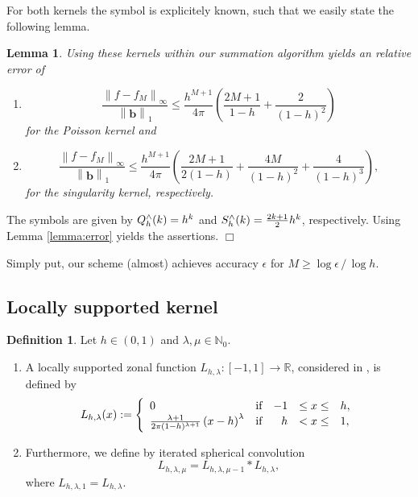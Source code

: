 \documentclass[11pt,a4paper,twoside,bibtotoc]{scrartcl}
\theoremstyle{plain}
\newtheorem{lemma}[theorem]{Lemma}
\theoremstyle{definition}
\newtheorem{definition}[theorem]{Definition}
\theoremstyle{remark}
\newenvironment{proof}{{\bf Proof.}}{$\Box$}
\newcommand{\NZ}{\ensuremath{\mathbb{N}_{0}}}
\newcommand{\R}{\ensuremath{\mathbb{R}}}
\newcommand{\interv}[4]{\ensuremath{\left#1\left.#2,#3\right#4\right.}}
\newcommand{\fun}[2]{\ensuremath{#1{\hspace{-0.4ex}}\left(#2\right)}}
\newcommand{\paren}[1]{\ensuremath{\left(#1\right)}}
\newcommand{\mb}[1]{\mathbf{#1}}
\newcommand{\V}[1]{\mb{#1}}
\numberwithin{equation}{section}
\numberwithin{table}{section}
\numberwithin{figure}{section}
\begin{document}
For both kernels the symbol is explicitely known, such that we easily state
the following lemma.
\begin{lemma}
 Using these kernels within our summation algorithm yields an relative error
 of
 \begin{enumerate}
   \item
     \begin{equation}
       \label{error:poisson}
       \frac{\left\|f - f_{M}\right\|_{\infty}}{\left\|\V{b}\right\|_1} \le
       \frac{h^{M+1}}{4\pi} \left(\frac{2M+1}{1-h}+\frac{2}{\left(1-h\right)^2}\right)
     \end{equation}
     for the Poisson kernel and
     \item 
       \begin{equation}
         \label{error:singular}
         \frac{\left\|f - f_{M}\right\|_{\infty}}{\left\|\V{b}\right\|_1} \le
         \frac{h^{M+1}}{4\pi} \left(\frac{2M+1}{2\left(1-h\right)}+
           \frac{4M}{\left(1-h\right)^2}+ \frac{4}{\left(1-h\right)^3}\right),
       \end{equation}
       for the singularity kernel, respectively.
 \end{enumerate}
\end{lemma}
\begin{proof}
The symbols are given by $\fun{Q_{h}^{\wedge}}{k}=h^k$ and
$\fun{S_{h}^{\wedge}}{k}=\frac{2k+1}{2}h^k$, respectively.
Using Lemma \ref{lemma:error} yields the assertions.
\end{proof}
  
Simply put, our scheme (almost) achieves accuracy $\epsilon$ for $M \ge \log\epsilon \,
/ \, \log h$.

\subsection{Locally supported kernel}
\begin{definition}
  Let $h \in \interv{(}{0}{1}{)}$ and $\lambda,\mu \in \NZ$.
  \begin{enumerate}
  \item A locally supported zonal function
    $L_{h,\lambda}:\interv{[}{-1}{1}{]} \rightarrow \R$, considered in
    \cite{Sc97}, is defined by
    \[
    \fun{L_{h,\lambda}}{x} := 
    \left\{\begin{array}{l@{\quad \text{if} \quad}rcl} 
        0 & -1 &\le x \le& h, \\
        \frac{\lambda+1}{2\pi(1-h)^{\lambda+1}}\paren{x-h}^{\lambda} &  h & <  x \le& 1,
      \end{array}\right.
    \]
  \item Furthermore, we define by iterated spherical convolution
    \[
    L_{h,\lambda,\mu} = L_{h,\lambda,\mu-1} * L_{h,\lambda},
    \]
    where $L_{h,\lambda,1}=L_{h,\lambda}$.
  \end{enumerate}
\end{definition}
\end{document}
